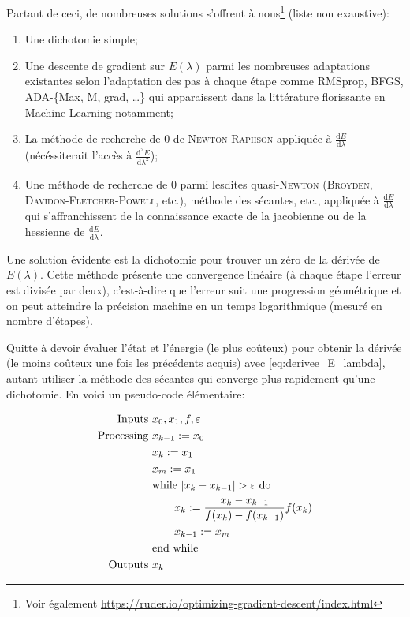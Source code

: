 \documentclass[svgnames,dvipsnames,a4paper,10pt,french]{report}
\begin{document}
Partant de ceci, de nombreuses solutions s'offrent à nous\footnote{Voir également \url{https://ruder.io/optimizing-gradient-descent/index.html}} (liste non exaustive):


\begin{enumerate}
    \item Une dichotomie simple;
    \item Une descente de gradient sur $E(\lambda)$ parmi les nombreuses adaptations existantes selon l'adaptation des pas à chaque étape comme RMSprop, BFGS, ADA-\{Max, M, grad, \dots\} qui apparaissent dans la littérature florissante en Machine Learning notamment;
    \item La méthode de recherche de 0 de \textsc{Newton-Raphson} appliquée à $\frac{\mathrm{d}E}{\mathrm{d}\lambda}$ (nécéssiterait l'accès à $\frac{\mathrm{d}^2E}{\mathrm{d}\lambda^2}$);
    \item Une méthode de recherche de 0 parmi lesdites quasi-\textsc{Newton} (\textsc{Broyden}, \textsc{Davidon-Fletcher-Powell}, etc.), méthode des sécantes, etc., appliquée à $\frac{\mathrm{d}E}{\mathrm{d}\lambda}$ qui s'affranchissent de la connaissance exacte de la jacobienne ou de la hessienne de $\frac{\mathrm{d}E}{\mathrm{d}\lambda}$.
\end{enumerate}

Une solution évidente est la dichotomie pour trouver un zéro de la dérivée de $E(\lambda)$. Cette méthode présente une convergence linéaire (à chaque étape l'erreur est divisée par deux),  c'est-à-dire que l'erreur suit une progression géométrique et on peut atteindre la précision machine en un temps logarithmique (mesuré en nombre d'étapes).

Quitte à devoir évaluer l'état et l'énergie (le plus coûteux) pour obtenir la dérivée (le moins coûteux une fois les précédents acquis) avec \ref{eq:derivee_E_lambda}, autant utiliser la méthode des sécantes qui converge plus rapidement qu'une dichotomie. En voici un pseudo-code élémentaire:

\begin{align*}
\hbox{Inputs }& x_0, x_1, f, \varepsilon \\
\hbox{Processing } & x_{k-1} := x_0 \\
&  x_{k} := x_1 \\
&  x_m := x_1 \\
& \hbox{while } |x_k - x_{k-1}|>\varepsilon  \hbox{ do} \\
& \qquad x_{k} := \frac{x_k-x_{k-1}}{f(x_k)-f(x_{k-1})}f(x_k) \\
& \qquad x_{k-1} := x_m \\
& \hbox{end while} \\
\hbox{Outputs } & x_{k}
\end{align*}
\end{document}
